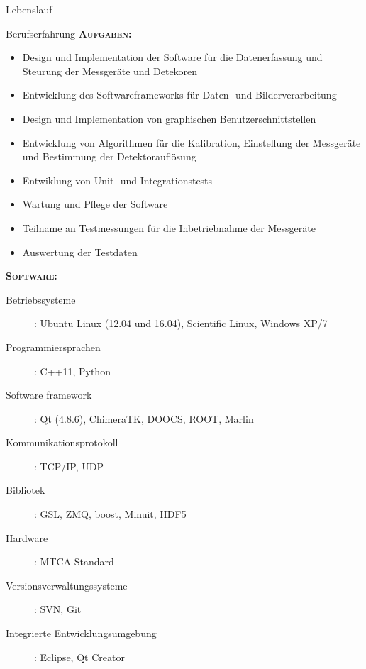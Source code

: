 \documentclass[11pt,a4paper]{scrartcl}
\begin{document}
\begin{cv}{Lebenslauf}
\begin{cvlist}{Berufserfahrung}
{\scshape {\bfseries Aufgaben:}}
\begin{itemize}
  \item Design und Implementation der Software f{\"u}r die Datenerfassung und
  Steurung der Messger{\"a}te und Detekoren
  \item Entwicklung des Softwareframeworks f{\"u}r Daten- und
  Bilderverarbeitung
  \item Design und Implementation von graphischen Benutzerschnittstellen
  \item Entwicklung von Algorithmen f{\"u}r die Kalibration, 
  Einstellung der Messger{\"a}te und Bestimmung der Detektoraufl{\"o}sung
  \item Entwiklung von Unit- und Integrationstests
  \item Wartung und Pflege der Software
  \item Teilname an Testmessungen f{\"u}r die Inbetriebnahme der Messger{\"a}te
  \item Auswertung der Testdaten
\end{itemize}
{\scshape {\bfseries Software:}}
\begin{description}
\item[Betriebssysteme] : Ubuntu Linux (12.04 und 16.04), Scientific Linux,
Windows XP/7
\item[Programmiersprachen] : C++11, Python
\item[Software framework] : Qt (4.8.6), ChimeraTK, DOOCS, ROOT, Marlin
\item[Kommunikationsprotokoll] : TCP/IP, UDP
\item[Bibliotek] : GSL, ZMQ, boost, Minuit, HDF5
\item[Hardware] : MTCA Standard
\item[Versionsverwaltungssysteme] : SVN, Git
\item[Integrierte Entwicklungsumgebung] : Eclipse, Qt Creator
\end{description}


\end{cvlist}
\end{cv}
\end{document}
